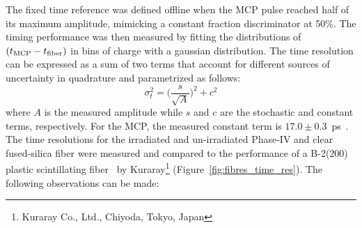 \documentclass[a4paper,11pt]{article}
\begin{document}
The fixed time reference was defined offline when the MCP pulse reached half of its maximum amplitude, mimicking a constant fraction discriminator at 50\%. The timing performance was then measured by fitting the distributions of $(t_{\rm MCP} - t_{\rm fiber})$ in bins of charge with a gaussian distribution.  The time resolution can be expressed as a sum of two terms that account for different sources of uncertainty in quadrature and parametrized as follows:
\begin{equation}
    \sigma_t^2 = \bigg( \frac{s}{\sqrt{A}} \bigg)^2 + c^2
    \label{eq:eq}
\end{equation}
where $A$ is the measured amplitude while $s$ and $c$ are the stochastic and constant terms, respectively. For the MCP, the measured constant term is $17.0\pm0.3$~ps~\cite{r-MCP}.  The time resolutions for the irradiated and un-irradiated Phase-IV and clear fused-silica fiber were measured and compared to the performance of a B-2(200) plastic scintillating fiber~\cite{r-B2} by Kuraray\footnote{Kuraray Co., Ltd., Chiyoda, Tokyo, Japan} (Figure~\ref{fig:fibres_time_res}).  The following observations can be made:
\end{document}
